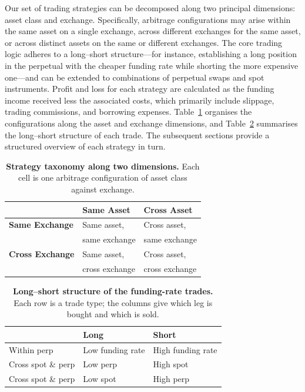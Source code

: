 \documentclass[10pt,twocolumn,a4paper]{article}
\begin{document}
Our set of trading strategies can be decomposed along two principal
dimensions: asset class and exchange.  Specifically, arbitrage
configurations may arise within the same asset on a single exchange,
across different exchanges for the same asset, or across distinct assets
on the same or different exchanges.  The core trading logic adheres to a
long--short structure---for instance, establishing a long position in the
perpetual with the cheaper funding rate while shorting the more expensive
one---and can be extended to combinations of perpetual swaps and spot
instruments.  Profit and loss for each strategy are calculated as the
funding income received less the associated costs, which primarily include
slippage, trading commissions, and borrowing expenses.
Table~\ref{tab:taxonomy} organises the configurations along the asset and
exchange dimensions, and Table~\ref{tab:longshort} summarises the
long--short structure of each trade.  The subsequent sections provide a
structured overview of each strategy in turn.

\begin{table}[H]
  \centering
  \caption{\textbf{Strategy taxonomy along two dimensions.}  Each cell is
           one arbitrage configuration of asset class against exchange.}
  \label{tab:taxonomy}
  \begin{tabular}{lll}
    \toprule
     & \textbf{Same Asset} & \textbf{Cross Asset} \\
    \midrule
    \textbf{Same Exchange}  & Same asset,  & Cross asset, \\
                            & same exchange & same exchange \\
    \textbf{Cross Exchange} & Same asset,  & Cross asset, \\
                            & cross exchange & cross exchange \\
    \bottomrule
  \end{tabular}
\end{table}

\begin{table}[H]
  \centering
  \caption{\textbf{Long--short structure of the funding-rate trades.}
           Each row is a trade type; the columns give which leg is bought
           and which is sold.}
  \label{tab:longshort}
  \begin{tabular}{lll}
    \toprule
     & \textbf{Long} & \textbf{Short} \\
    \midrule
    Within perp        & Low funding rate & High funding rate \\
    Cross spot \& perp & Low perp         & High spot \\
    Cross spot \& perp & Low spot         & High perp \\
    \bottomrule
  \end{tabular}
\end{table}
\end{document}
